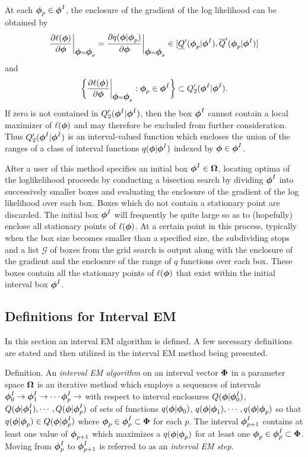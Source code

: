 At each $\mbox{\boldmath $\phi$}_p \in \mbox{\boldmath $\phi$}^I$, the enclosure of the gradient of the
log likelihood can be obtained by 
$$
\frac{\partial \ell(\mbox{\boldmath $\phi$})}{\partial \mbox{\boldmath $\phi$}} \bigg| _{\mbox{\boldmath $\phi$}=\mbox{\boldmath $\phi$}_p} 
= \frac{\partial q(\mbox{\boldmath $\phi$}|\mbox{\boldmath $\phi$}_p)}{\partial \mbox{\boldmath $\phi$}} \bigg| _{\mbox{\boldmath $\phi$}=\mbox{\boldmath $\phi$}_p} 
\in
[\underline{Q}'(\mbox{\boldmath $\phi$}_p | \mbox{\boldmath $\phi$}^I), \overline{Q}'(\mbox{\boldmath $\phi$}_p | \mbox{\boldmath $\phi$}^I)]
$$
and
$$
\bigg\{ \frac{\partial\ell(\mbox{\boldmath $\phi$})}{\partial\mbox{\boldmath $\phi$}} 
  \bigg|_{\mbox{\boldmath $\phi$} = \mbox{\boldmath $\phi$}_p} : \mbox{\boldmath $\phi$}_p \in \mbox{\boldmath $\phi$}^I \bigg\}
\subset Q'_2(\mbox{\boldmath $\phi$}^I | \mbox{\boldmath $\phi$}^I).
$$
If zero is not contained in  $Q'_2(\mbox{\boldmath $\phi$}^I | \mbox{\boldmath $\phi$}^I)$,
then the box 
$\mbox{\boldmath $\phi$}^I$ cannot contain a local maximizer of $\ell(\mbox{\boldmath $\phi$})$ and may therefore
be excluded from further consideration.
Thus $Q'_2(\mbox{\boldmath $\phi$}^I | \mbox{\boldmath $\phi$}^I)$ is an interval-valued function which
encloses the union of the ranges of a class of interval 
functions $q(\mbox{\boldmath $\phi$}|\mbox{\boldmath $\phi$}^I)$
indexed by $\mbox{\boldmath $\phi$} \in \mbox{\boldmath $\phi$}^I$.

After a user of this method specifies an initial box $\mbox{\boldmath $\phi$}^I
\in \mbox{\boldmath $\Omega$}$, locating optima of the loglikelihood proceeds by
conducting a bisection search by 
dividing $\mbox{\boldmath $\phi$}^I$ into successively smaller boxes and evaluating the
enclosure of the gradient of the log likelihood over each box.  Boxes which
do not contain a stationary point are discarded.  The initial box $\mbox{\boldmath $\phi$}^I$
will frequently be quite large so as to (hopefully) enclose all stationary
points of $\ell(\mbox{\boldmath $\phi$})$.
At a certain
point in this process, 
typically when the box size becomes smaller than a specified size, 
the subdividing stops and a list $\mathcal{G}$
of boxes from the grid search
is output along with the enclosure of the gradient
and the enclosure of the range of $q$ functions over each box.  These boxes
contain all the stationary points of $\ell(\mbox{\boldmath $\phi$})$ that exist within the
initial interval box $\mbox{\boldmath $\phi$}^I$.

\subsection{Definitions for Interval EM}

In this section an interval EM algorithm is defined.
A few necessary definitions are stated and then utilized in the interval EM
method being presented.

Definition.  An {\it interval EM algorithm}
on an interval vector $\mbox{\boldmath $\Phi$}$ in a parameter space $\mbox{\boldmath $\Omega$}$ is an iterative
method which employs a sequences of intervals
$\mbox{\boldmath $\phi$}^I_0 \rightarrow  \mbox{\boldmath $\phi$}^I_1 \rightarrow  \cdots \mbox{\boldmath $\phi$}^I_p \rightarrow$
with respect to interval enclosures 
$Q(\mbox{\boldmath $\phi$} | {\mbox{\boldmath $\phi$}}^I_0)$, $Q(\mbox{\boldmath $\phi$} | {\mbox{\boldmath $\phi$}}^I_1), \cdots,
Q(\mbox{\boldmath $\phi$} | {\mbox{\boldmath $\phi$}}^I_p)$
of sets of functions 
$q(\mbox{\boldmath $\phi$} | \mbox{\boldmath $\phi$}_0)$, $q(\mbox{\boldmath $\phi$} | \mbox{\boldmath $\phi$}_1), \cdots, 
q(\mbox{\boldmath $\phi$} | \mbox{\boldmath $\phi$}_p)$ so that 
$q(\mbox{\boldmath $\phi$} | \mbox{\boldmath $\phi$}_p) \in Q(\mbox{\boldmath $\phi$} | \mbox{\boldmath $\phi$}^I_p)$ where 
$\mbox{\boldmath $\phi$}_p \in \mbox{\boldmath $\phi$}^I_p \subset \mbox{\boldmath $\Phi$}$
for each $p$.  The interval $\mbox{\boldmath $\phi$}^I_{p+1}$ contains at least one value of
$\mbox{\boldmath $\phi$}_{p+1}$ which maximizes a $q(\mbox{\boldmath $\phi$} | \mbox{\boldmath $\phi$}_p)$ for at least one
$ \mbox{\boldmath $\phi$}_p \in \mbox{\boldmath $\phi$}^I_p \subset \mbox{\boldmath $\Phi$}$.
Moving from $\mbox{\boldmath $\phi$}_p^I$ to $\mbox{\boldmath $\phi$}_{p+1}^I$ 
is referred to
as an {\it interval EM step}.


